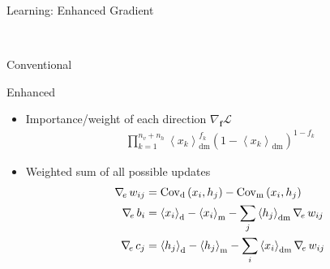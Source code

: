\documentclass{beamer}
\newcommand{\qexp}[1]{\left<#1\right>}
\newcommand{\vect}[1]{\mathbf{#1}}
\newcommand{\cov}[0]{\operatorname{Cov}}
\newcommand{\vf}[0]{\vect{f}}
\newcommand{\td}[0]{\text{d}}
\newcommand{\tf}[0]{\text{m}}
\newcommand{\tdf}[0]{\text{dm}}
\newcommand{\LL}[0]{\mathcal{L}}
\newcommand{\enhnabla}[0]{\nabla_{\hspace{-0.5mm}e}\,}
\begin{document}
\begin{frame}{Learning: Enhanced Gradient}
\begin{minipage}{0.35\textwidth}
\begin{minipage}{0.49\columnwidth}
\begin{minipage}{\columnwidth}
\begin{center}
                \end{center}
            \end{minipage}
        \end{minipage}
        \\
        \begin{minipage}{0.49\columnwidth}
            \scriptsize
            \begin{center}
                Conventional
            \end{center}
        \end{minipage}
        \hfill
        \begin{minipage}{0.49\columnwidth}
            \scriptsize
            \begin{center}
                Enhanced
            \end{center}
        \end{minipage}
    \end{minipage}
    \hfill
    \begin{minipage}{0.64\textwidth}
        \small 
        \begin{itemize}
            \item Importance/weight of each direction $\nabla_{\vf} \LL$
                \begin{align*}
                    \prod_{k=1}^{n_v+n_h} \qexp{x_k}_\tdf^{f_k}
                    \left( 1 - \qexp{x_k}_\tdf
                    \right)^{1-f_k} 
                \end{align*}

            \item Weighted sum of all possible updates 
            \begin{align*}
                \enhnabla w_{ij} &= \cov_\td\left(x_i, h_j\right)
                - \cov_\tf\left(x_i, h_j\right)
                \\
                \enhnabla b_i &= \left<x_i\right>_\td - \left<x_i\right>_\tf
                - \sum_j \qexp{ h_j }_\tdf
                \enhnabla w_{ij}
                \\
                \enhnabla c_j &= \left<h_j\right>_\td - \left<h_j\right>_\tf
                - \sum_i \qexp{ x_i }_\tdf
                \enhnabla w_{ij}
            \end{align*}
        \end{itemize}
    \end{minipage}
\end{frame}
\end{document}
